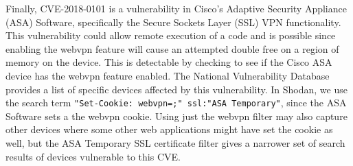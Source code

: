 Finally, CVE-2018-0101 is a vulnerability in Cisco's Adaptive Security Appliance (ASA)
Software, specifically the Secure Sockets Layer (SSL) VPN functionality. This
vulnerability could allow remote execution of a code and is possible since
enabling the webvpn feature will cause an attempted double free on a region
of memory on the device. This is detectable by checking to see if the Cisco
ASA device has the webvpn feature enabled. The National Vulnerability Database
provides a list of specific devices affected by this vulnerability\cite{CVE-2018-0101}. In Shodan,
we use the search term \verb|"Set-Cookie: webvpn=;" ssl:"ASA Temporary"|,
since the ASA Software sets a the webvpn cookie. Using just the webvpn filter
may also capture other devices where some other web applications might have
set the cookie as well, but the ASA Temporary SSL certificate filter gives
a narrower set of search results of devices vulnerable to this CVE. 
